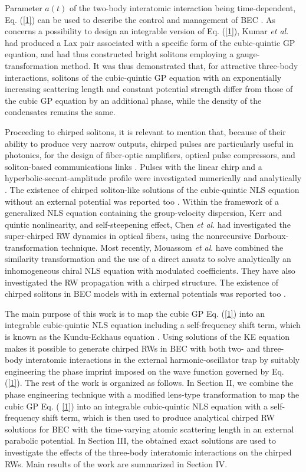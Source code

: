 \documentclass[preprintnumbers]{revtex4}
\begin{document}
Parameter $a(t)$ of the two-body interatomic interaction being
time-dependent, Eq. (\ref{1}) can be used to describe the control and
management of BEC \cite{book,we}. As concerns a possibility to design an
integrable version of Eq. (\ref{1}), Kumar \textit{et al}. \cite{17} had
produced a Lax pair associated with a specific form of the cubic-quintic GP
equation, and had thus constructed bright solitons employing a
gauge-transformation method. It was thus demonstrated that, for attractive
three-body interactions, solitons of the cubic-quintic GP equation with an
exponentially increasing scattering length and constant potential strength
differ from those of the cubic GP equation by an additional phase, while the
density of the condensates remains the same.

Proceeding to chirped solitons, it is relevant to mention that, because of
their ability to produce very narrow outputs, chirped pulses are
particularly useful in photonics, for the design of fiber-optic amplifiers,
optical pulse compressors, and soliton-based communications links \cite{22}.
Pulses with the linear chirp and a hyperbolic-secant-amplitude profile were
investigated numerically and analytically \cite{23}. The existence of
chirped soliton-like solutions of the cubic-quintic NLS equation without an
external potential was reported too \cite{24}. Within the framework of a
generalized NLS equation containing the group-velocity dispersion, Kerr and
quintic nonlinearity, and self-steepening effect, Chen \textit{et al}. \cite%
{25} had investigated the super-chirped RW dynamics in optical fibers, using
the nonrecursive Darboux-transformation technique. Most recently, Mouassom
\textit{et al}. \cite{26} have combined the similarity transformation and
the use of a direct ansatz to solve analytically an inhomogeneous chiral NLS
equation with modulated coefficients. They have also investigated the RW
propagation with a chirped structure. The existence of chirped solitons in
BEC models with in external potentials was reported too \cite{27}.

The main purpose of this work is to map the cubic GP Eq. (\ref{1}) into an
integrable cubic-quintic NLS equation including a self-frequency shift term,
which is known as the Kundu-Eckhaus equation \cite{300}. Using solutions of
the KE equation makes it possible to generate chirped RWs in BEC with both
two- and three-body interatomic interactions in the external
harmonic-oscillator trap by suitably engineering the phase imprint imposed
on the wave function governed by Eq. (\ref{1}). The rest of the work is
organized as follows. In Section II, we combine the phase engineering
technique with a modified lens-type transformation to map the cubic GP Eq. (%
\ref{1}) into an integrable cubic-quintic NLS equation with a self-frequency
shift term, which is then used to produce analytical chirped RW solutions
for BEC with the time-varying atomic scattering length in an external
parabolic potential. In Section III, the obtained exact solutions are used
to investigate the effects of the three-body interatomic interactions on the
chirped RWs. Main results of the work are summarized in Section IV.
\end{document}

